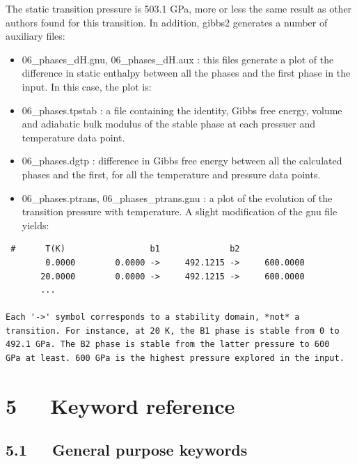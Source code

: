\documentclass[a4paper]{article}
\begin{document}
The static transition pressure is 503.1 GPa, more or less the same
result as other authors found for this transition. In addition, gibbs2
generates a number of auxiliary files:
%
\begin{itemize}

\item 06\_phases\_dH.gnu, 06\_phases\_dH.aux : this files generate a plot of
the difference in static enthalpy between all the phases and the
first phase in the input. In this case, the plot is:

\end{itemize}
%
\begin{itemize}

\item 06\_phases.tpstab : a file containing the identity, Gibbs free
energy, volume and adiabatic bulk modulus of the stable phase at
each pressuer and temperature data point.

\item 06\_phases.dgtp : difference in Gibbs free energy between all the
calculated phases and the first, for all the temperature and
pressure data points.

\item 06\_phases.ptrans, 06\_phases\_ptrans.gnu : a plot of the evolution of
the transition pressure with temperature. A slight modification of
the gnu file yields:

\end{itemize}
%
\asciilist
\begin{lstlisting}
 #      T(K)                 b1              b2
        0.0000        0.0000 ->     492.1215 ->     600.0000
       20.0000        0.0000 ->     492.1215 ->     600.0000
       ...

Each '->' symbol corresponds to a stability domain, *not* a
transition. For instance, at 20 K, the B1 phase is stable from 0 to
492.1 GPa. The B2 phase is stable from the latter pressure to 600
GPa at least. 600 GPa is the highest pressure explored in the input.
\end{lstlisting}


\section{5~~~Keyword reference%
  \label{keyword-reference}%
}


\subsection{5.1~~~General purpose keywords%
  \label{general-purpose-keywords}%
}
\end{document}
